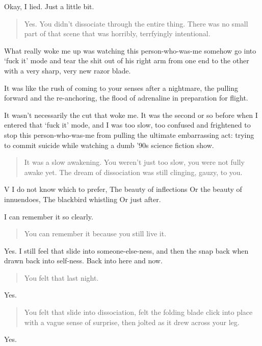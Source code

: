 Okay, I lied. Just a little bit.

\begin{quote}
Yes. You didn't dissociate through the entire thing. There was no small part of that scene that was horribly, terrfyingly intentional.
\end{quote}

What really woke me up was watching this person-who-was-me somehow go into `fuck it' mode and tear the shit out of his right arm from one end to the other with a very sharp, very new razor blade.

It was like the rush of coming to your senses after a nightmare, the pulling forward and the re-anchoring, the flood of adrenaline in preparation for flight.

It wasn't necessarily the cut that woke me. It was the second or so before when I entered that `fuck it' mode, and I was too slow, too confused and frightened to stop this person-who-was-me from pulling the ultimate embarrassing act: trying to commit suicide while watching a dumb '90s science fiction show.

\begin{quote}
It was a slow awakening. You weren't just too slow, you were not fully awake yet. The dream of dissociation was still clinging, gauzy, to you.
\end{quote}

V I do not know which to prefer, The beauty of inflections Or the beauty of innuendoes, The blackbird whistling Or just after.

I can remember it so clearly.

\begin{quote}
You can remember it because you still live it.
\end{quote}

Yes. I still feel that slide into someone-else-ness, and then the snap back when drawn back into self-ness. Back into here and now.

\begin{quote}
You felt that last night.
\end{quote}

Yes.

\begin{quote}
You felt that slide into dissociation, felt the folding blade click into place with a vague sense of surprise, then jolted as it drew across your leg.
\end{quote}

Yes.


